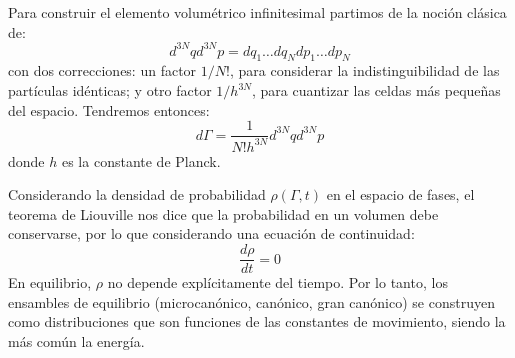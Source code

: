 \documentclass[]{article}
\numberwithin{equation}{section}
\newcommand{\0}{\textcolor{gray}{0}}
\begin{document}
Para construir el elemento volumétrico infinitesimal partimos de la noción clásica de:
\begin{equation*}
	d^{3N}q d^{3N}p = dq_1 \ldots dq_N dp_1 \ldots dp_N
\end{equation*}
con dos correcciones: un factor \(1/N!\), para considerar la indistinguibilidad de las partículas idénticas; y otro factor \(1/h^{3N}\), para cuantizar las celdas más pequeñas del espacio. Tendremos entonces:
\begin{equation}
	d\Gamma = \frac{1}{N!h^{3N}}d^{3N}q d^{3N}p\label{dGamma}
\end{equation}
donde \(h\) es la constante de Planck.

Considerando la densidad de probabilidad \(\rho(\Gamma, t)\) en el espacio de fases, el teorema de Liouville nos dice que la probabilidad en un volumen debe conservarse, por lo que considerando una ecuación de continuidad:
\begin{equation}
	\frac{d\rho}{dt} = 0
\end{equation}
En equilibrio, \(\rho\) no depende explícitamente del tiempo. Por lo tanto, los ensambles de equilibrio (microcanónico, canónico, gran canónico) se construyen como distribuciones que son funciones de las constantes de movimiento, siendo la más común la energía.
\end{document}
